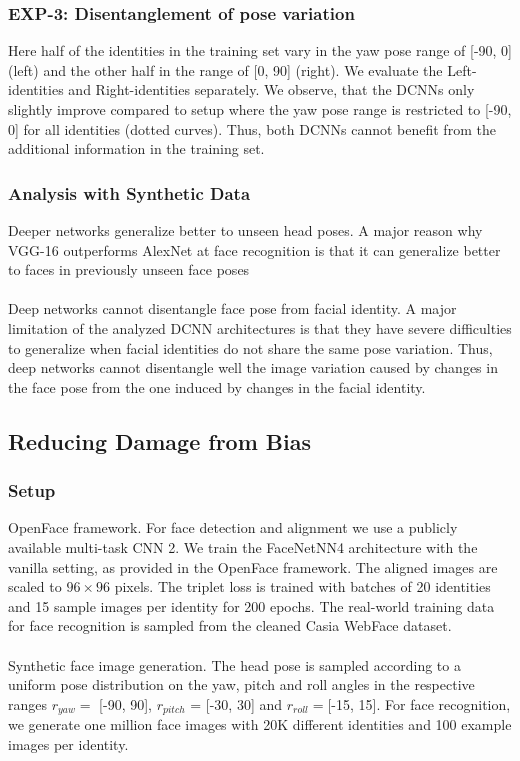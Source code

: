 \documentclass[12pt]{article}
\begin{document}
\subsubsection{EXP-3: Disentanglement of pose variation}
Here half of the identities in the training set vary in the
yaw pose range of [-90, 0] (left) and the other half in the range of [0, 90] (right). We evaluate the Left-identities and
Right-identities separately. We observe, that the DCNNs only slightly improve compared to
setup where the yaw pose range is restricted to [-90, 0]
for all identities (dotted curves). Thus, both DCNNs cannot
benefit from the additional information in the training set.
\subsubsection{Analysis with Synthetic Data}
Deeper networks generalize better to unseen head poses. A major reason why VGG-16 outperforms AlexNet
at face recognition is that it can generalize better to faces in
previously unseen face poses\\
\\
Deep networks cannot disentangle face pose from facial identity. A major limitation of the analyzed DCNN architectures is that they have severe difficulties to generalize
when facial identities do not share the same pose variation. Thus, deep networks cannot disentangle well
the image variation caused by changes in the face pose from
the one induced by changes in the facial identity.
\subsection{Reducing Damage from Bias}
\subsubsection{Setup}
OpenFace framework. For face detection
and alignment we use a publicly available multi-task CNN 2. We train the FaceNetNN4 architecture with the vanilla setting, as provided in the OpenFace
framework. The aligned images are scaled to $96\times96$ pixels. The triplet loss is trained with batches of 20 identities and
15 sample images per identity for 200 epochs. The real-world training data for face recognition is sampled from the cleaned Casia WebFace dataset.\\
\\
Synthetic face image generation. The head pose is sampled according to a uniform
pose distribution on the yaw, pitch and roll angles in the respective ranges $r_{yaw} =$ [-90, 90], $r_{pitch}$ = [-30, 30]
and $r_{roll} = $[-15, 15]. For face recognition, we generate
one million face images with 20K different identities and
100 example images per identity.
\end{document}
